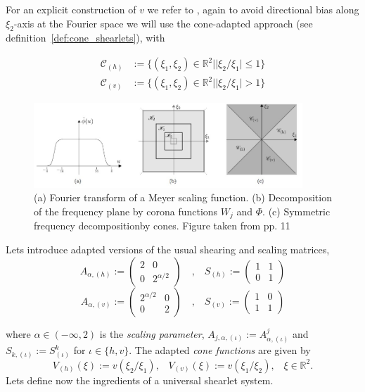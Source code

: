 For an explicit construction of $v$ we refer to \cite{Guo-Labate}, again to avoid directional bias along $\xi_2$-axis at the Fourier space we will use the cone-adapted approach (see definition~\ref{def:cone_shearlets}), with 

$$
\begin{aligned}
\mathcal{C}_{(h)} &:=\{ (\xi_1,\xi_2)\in\mathbb{R}^2||\xi_2/\xi_1|\leq 1\}\\
\mathcal{C}_{(v)} &:=\{ (\xi_1,\xi_2)\in\mathbb{R}^2||\xi_2/\xi_1|>1\}
\end{aligned}
$$

\begin{figure}[h!]
\centering
\includegraphics[width=0.9\textwidth]{./Diagrams/alphapartcones.jpg}
\caption{(a) Fourier transform of a Meyer scaling function. (b) Decomposition of the frequency plane by corona functions $W_j$ and $\Phi$. (c) Symmetric frequency decompositionby cones. Figure taken from \cite{Gitta-alpha} pp. 11}
\label{fig:separable_nonseparable}
\end{figure}

Lets introduce adapted versions of the usual shearing and scaling matrices,
$$
A_{\alpha,(h)}:=\left(\begin{matrix} 2 & 0 \\ 0 & 2^{\alpha/2}\end{matrix}\right) \quad \textrm{,}\quad S_{(h)}:=\left(\begin{matrix} 1 & 1\\ 0 & 1\end{matrix}\right)
$$
$$
A_{\alpha,(v)}:=\left(\begin{matrix}2^{\alpha/2} & 0 \\ 0 & 2 \end{matrix}\right)\quad \textrm{,}\quad S_{(v)}:=\left(\begin{matrix} 1 & 0 \\ 1 & 1\end{matrix}\right)
$$

where $\alpha\in (-\infty,2)$ is the \textit{scaling parameter}, $A_{j,\alpha,(\iota)}:=A^j_{\alpha,(\iota)}$ and $S_{k,(\iota)}:=S^k_{(\iota)}$ for $\iota\in\{h,v\}$. The adapted \textit{cone functions} are given by
$$
V_{(h)}(\xi):=v(\xi_2/\xi_1)\textrm{,}\quad V_{(v)}(\xi):=v(\xi_1/\xi_2)\textrm{,}\quad \xi\in\mathbb{R}^2.
$$
Lets define now the ingredients of a universal shearlet system.

